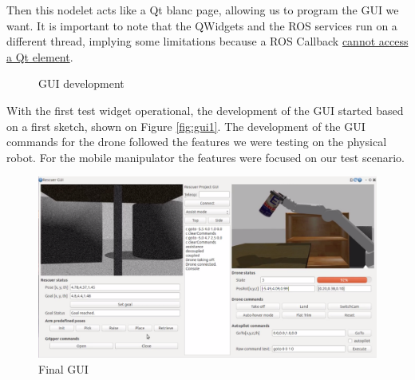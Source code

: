 \documentclass[11pt,a4paper]{article}
\begin{document}
Then this nodelet acts like a Qt blanc page, allowing us to program the GUI we want. It is 
important to note that the QWidgets and the ROS services run on a different thread, implying some limitations because a ROS Callback
\href{http://wiki.ros.org/rqt/Tutorials/Writing\%20a\%20C\%2B\%2B\%20Plugin}
{cannot access a Qt element}.

\begin{figure}[ht!]%
	\centering
    \qquad  
    \qquad  
    \caption{GUI development}
    \label{fig:gui}
\end{figure}

With the first test widget operational, the development of the GUI started based on a first sketch, shown on Figure \ref{fig:gui1}. The development of the GUI commands for the drone followed the features we were
testing on the physical robot. For the mobile manipulator the features were focused on our test scenario.

\begin{figure}[ht]
	\centering
    \includegraphics[width=14cm]{guiV4.png}
    \caption{Final GUI}
    \label{fig:gui4}
\end{figure}
\end{document}
